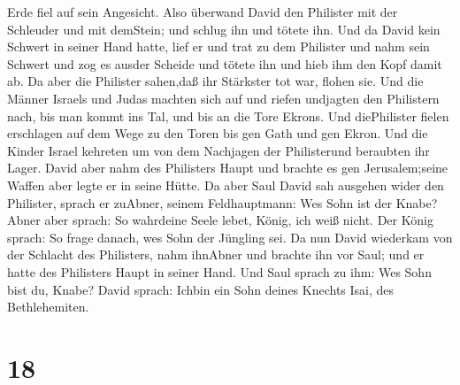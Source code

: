 Erde fiel auf sein Angesicht.  Also überwand David den
Philister mit der Schleuder und mit demStein; und schlug ihn und tötete
ihn. Und da David kein Schwert in seiner Hand hatte,  lief
er und trat zu dem Philister und nahm sein Schwert und zog es ausder
Scheide und tötete ihn und hieb ihm den Kopf damit ab. Da aber die
Philister sahen,daß ihr Stärkster tot war, flohen sie.  Und
die Männer Israels und Judas machten sich auf und riefen undjagten den
Philistern nach, bis man kommt ins Tal, und bis an die Tore Ekrons. Und
diePhilister fielen erschlagen auf dem Wege zu den Toren bis gen Gath
und gen Ekron.  Und die Kinder Israel kehreten um von dem
Nachjagen der Philisterund beraubten ihr Lager.  David aber
nahm des Philisters Haupt und brachte es gen Jerusalem;seine Waffen aber
legte er in seine Hütte.  Da aber Saul David sah ausgehen
wider den Philister, sprach er zuAbner, seinem Feldhauptmann: Wes Sohn
ist der Knabe? Abner aber sprach: So wahrdeine Seele lebet, König, ich
weiß nicht.  Der König sprach: So frage danach, wes Sohn
der Jüngling sei.  Da nun David wiederkam von der Schlacht
des Philisters, nahm ihnAbner und brachte ihn vor Saul; und er hatte des
Philisters Haupt in seiner Hand.  Und Saul sprach zu ihm:
Wes Sohn bist du, Knabe? David sprach: Ichbin ein Sohn deines Knechts
Isai, des Bethlehemiten.

\hypertarget{section-17}{%
\section{18}\label{section-17}}

